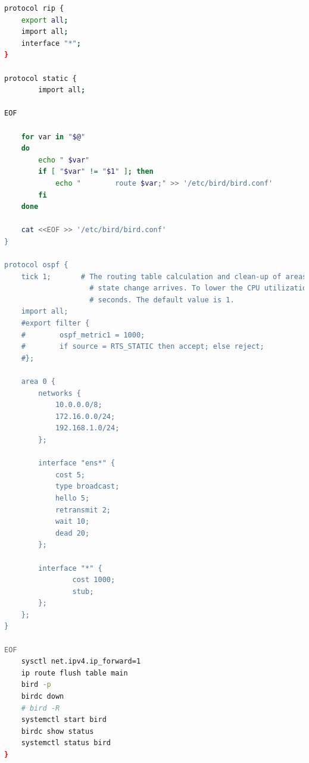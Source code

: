 \documentclass[11pt,titlepage]{article}
\begin{document}
\begin{lstlisting}[language=bash,caption={~/doConfig.sh}]
protocol rip {
    export all;
    import all;
    interface "*";
}

protocol static {
        import all;

EOF
    
    for var in "$@"
    do
        echo " $var"
        if [ "$var" != "$1" ]; then
            echo "        route $var;" >> '/etc/bird/bird.conf'
        fi
    done
    
    cat <<EOF >> '/etc/bird/bird.conf'
}

protocol ospf {
    tick 1;       # The routing table calculation and clean-up of areas' databases is not performed when a single link
                    # state change arrives. To lower the CPU utilization, it's processed later at periodical intervals of num
                    # seconds. The default value is 1.
    import all;
    #export filter {
    #        ospf_metric1 = 1000;
    #        if source = RTS_STATIC then accept; else reject;
    #};

    area 0 {
        networks {
            10.0.0.0/8;
            172.16.0.0/24;
            192.168.1.0/24;
        };
        
        interface "ens*" {
            cost 5;
            type broadcast;
            hello 5; 
            retransmit 2; 
            wait 10; 
            dead 20;
        };

        interface "*" {
                cost 1000;
                stub;
        };
    };
}

EOF
    sysctl net.ipv4.ip_forward=1
    ip route flush table main
    bird -p
    birdc down
    # bird -R
    systemctl start bird
    birdc show status
    systemctl status bird
}


\end{lstlisting}
\end{document}
